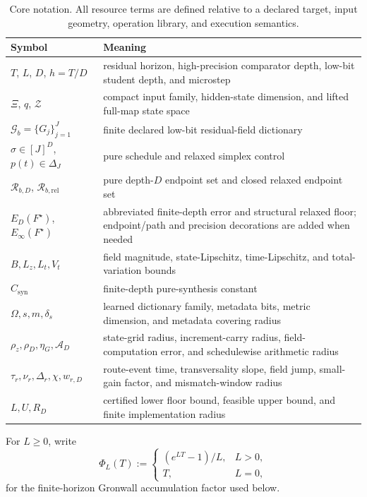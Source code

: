 \documentclass[twoside,11pt]{article}
\newcommand{\Z}{\mathcal{Z}}
\newcommand{\Rel}{\mathrm{rel}}
\newcommand{\RR}{\mathscr{R}}
\begin{document}
\begin{table}[t]
\centering
\caption{Core notation.  All resource terms are defined relative to a declared target, input geometry, operation library, and execution semantics.}
\label{tab:notation}
\small
\begin{tabularx}{\linewidth}{Y{.26\linewidth}X}
\toprule
Symbol & Meaning \\
\midrule
$T$, $L$, $D$, $h=T/D$ & residual horizon, high-precision comparator depth, low-bit student depth, and microstep \\
$\Xi$, $q$, $\Z$ & compact input family, hidden-state dimension, and lifted full-map state space \\
$\mathcal G_b=\{G_j\}_{j=1}^J$ & finite declared low-bit residual-field dictionary \\
$\sigma\in[J]^D$, $p(t)\in\Delta_J$ & pure schedule and relaxed simplex control \\
$\RR_{b,D}$, $\RR_{b,\Rel}$ & pure depth-$D$ endpoint set and closed relaxed endpoint set \\
$E_D(F^\star)$, $E_\infty(F^\star)$ & abbreviated finite-depth error and structural relaxed floor; endpoint/path and precision decorations are added when needed \\
$B,L_z,L_t,V_t$ & field magnitude, state-Lipschitz, time-Lipschitz, and total-variation bounds \\
$C_{\mathrm{syn}}$ & finite-depth pure-synthesis constant \\
$\Omega,s,m,\delta_s$ & learned dictionary family, metadata bits, metric dimension, and metadata covering radius \\
$\rho_z,\rho_D,\eta_G,\mathcal A_D$ & state-grid radius, increment-carry radius, field-computation error, and schedulewise arithmetic radius \\
$\tau_r,\nu_r,\Delta_r,\chi,w_{r,D}$ & route-event time, transversality slope, field jump, small-gain factor, and mismatch-window radius \\
$L,U,R_D$ & certified lower floor bound, feasible upper bound, and finite implementation radius \\
\bottomrule
\end{tabularx}
\end{table}

For $L\ge0$, write
\begin{equation}
 \Phi_L(T):=
 \begin{cases}
 (e^{LT}-1)/L,&L>0,\\
 T,&L=0,
 \end{cases}
 \label{eq:gronwall-factor-main}
\end{equation}
for the finite-horizon Gronwall accumulation factor used below.
\end{document}
